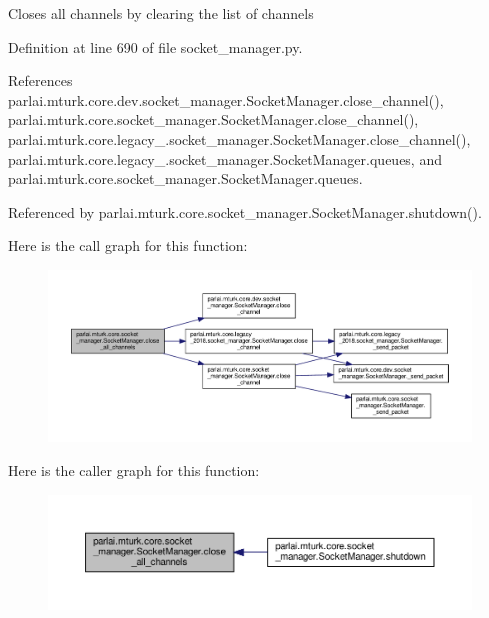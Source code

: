 \begin{DoxyVerb}Closes all channels by clearing the list of channels\end{DoxyVerb}
 

Definition at line 690 of file socket\+\_\+manager.\+py.



References parlai.\+mturk.\+core.\+dev.\+socket\+\_\+manager.\+Socket\+Manager.\+close\+\_\+channel(), parlai.\+mturk.\+core.\+socket\+\_\+manager.\+Socket\+Manager.\+close\+\_\+channel(), parlai.\+mturk.\+core.\+legacy\+\_.\+socket\+\_\+manager.\+Socket\+Manager.\+close\+\_\+channel(), parlai.\+mturk.\+core.\+legacy\+\_.\+socket\+\_\+manager.\+Socket\+Manager.\+queues, and parlai.\+mturk.\+core.\+socket\+\_\+manager.\+Socket\+Manager.\+queues.



Referenced by parlai.\+mturk.\+core.\+socket\+\_\+manager.\+Socket\+Manager.\+shutdown().

Here is the call graph for this function\+:
\nopagebreak
\begin{figure}[H]
\begin{center}
\leavevmode
\includegraphics[width=350pt]{classparlai_1_1mturk_1_1core_1_1socket__manager_1_1SocketManager_a9a2c04d9512e6866dfda33397d8f363c_cgraph}
\end{center}
\end{figure}
Here is the caller graph for this function\+:
\nopagebreak
\begin{figure}[H]
\begin{center}
\leavevmode
\includegraphics[width=350pt]{classparlai_1_1mturk_1_1core_1_1socket__manager_1_1SocketManager_a9a2c04d9512e6866dfda33397d8f363c_icgraph}
\end{center}
\end{figure}
\mbox{\label{classparlai_1_1mturk_1_1core_1_1socket__manager_1_1SocketManager_ae079bc95ebedcab4e52325253db490cf}} 
